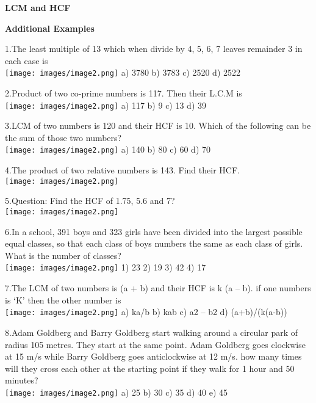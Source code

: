 \documentclass[
]{article}
\author{}
\date{}
\begin{document}
\begin{center}
	{\LARGE \textbf{LCM and HCF \\}}
\end{center}

{\large \textbf{Additional Examples \\}}

1.The least multiple of 13 which when divide by 4, 5, 6, 7 leaves remainder 3 in each case is \\
\texttt{[image: images/image2.png]}   a) 3780 	b) 3783 	c) 2520 	d) 2522

2.Product of two co-prime numbers is 117. Then their L.C.M is  \\
\texttt{[image: images/image2.png]}  a) 117 	b) 9 	c) 13 	d) 39

3.LCM of two numbers is 120 and their HCF is 10. Which of the following can be the sum of those two numbers? \\
\texttt{[image: images/image2.png]}  a) 140 	b) 80 	c) 60 	d) 70

4.The product of two relative numbers is 143. Find their HCF. \\
\texttt{[image: images/image2.png]}  

5.Question: Find the HCF of 1.75, 5.6 and 7? \\
\texttt{[image: images/image2.png]}  

6.In a school, 391 boys and 323 girls have been divided into the largest possible equal classes, so that each class of boys numbers the same as each class of girls. What is the number of 	classes? \\
\texttt{[image: images/image2.png]}  1) 23 	2) 19 	3) 42 	4) 17

7.The LCM of two numbers is (a + b) and their HCF is k (a – b). if one numbers is ‘K’ then the other number is  \\
\texttt{[image: images/image2.png]}  	a) ka/b 	b) kab 	c) a2 – b2 	d) (a+b)/(k(a-b))

8.Adam Goldberg and Barry Goldberg start walking around a circular park of radius 105 metres. They start at the same point. Adam Goldberg goes clockwise at 15 m/s while Barry 	Goldberg goes anticlockwise at 12 m/s. how many times will they cross each other at the starting point if they walk for 1 hour and 50 minutes? \\
\texttt{[image: images/image2.png]}  a) 25 	b) 30 	c) 35 	d) 40 	e) 45
\end{document}
